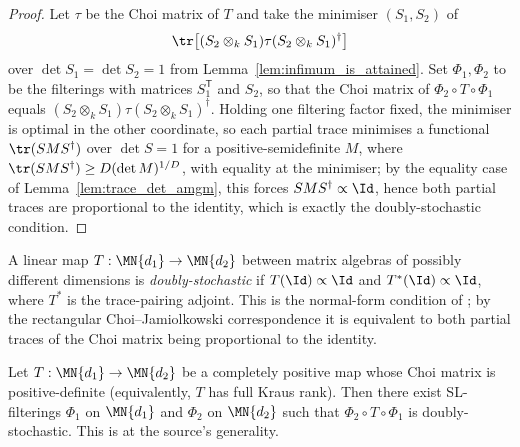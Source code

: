 \begin{proof}\leanok
    Let $\tau$ be the Choi matrix of $T$ and take the minimiser
    $(S_{1},S_{2})$ of
    \begin{align}
        \tr\!\left[(S_{2}\otimes_{k}S_{1})\tau
            (S_{2}\otimes_{k}S_{1})^{\dagger}\right]
        \notag
    \end{align}
    over $\det S_{1}=\det S_{2}=1$ from
    Lemma~\ref{lem:infimum_is_attained}. Set $\Phi_{1},\Phi_{2}$ to be the
    filterings with matrices $S_{1}^{\mathsf T}$ and $S_{2}$, so that the Choi
    matrix of $\Phi_{2}\circ T\circ\Phi_{1}$ equals
    $(S_{2}\otimes_{k}S_{1})\tau
    (S_{2}\otimes_{k}S_{1})^{\dagger}$. Holding one filtering factor fixed,
    the minimiser is optimal in the other coordinate, so each partial trace
    minimises a functional $\tr(SMS^{\dagger})$ over $\det S=1$ for a
    positive-semidefinite $M$, where
    $\tr(SMS^{\dagger})\geq D(\det M)^{1/D}$, with equality at the minimiser;
    by the equality case of Lemma~\ref{lem:trace_det_amgm}, this forces
    $SMS^{\dagger}\propto\Id$, hence both partial traces are proportional to
    the identity, which is exactly the doubly-stochastic condition.
\end{proof}

\begin{definition}
    \label{def:doubly_stochastic_rect}
    \leanok
    A linear map $T : \MN{d_1} \to \MN{d_2}$ between matrix algebras of
    possibly different dimensions is \emph{doubly-stochastic} if
    $T(\Id)\propto\Id$ and $T^{*}(\Id)\propto\Id$, where $T^{*}$ is the
    trace-pairing adjoint.  This is the normal-form condition of
    \cite[Proposition~2.9]{Wolf2012Quantum}; by the rectangular
    Choi--Jamiolkowski correspondence it is equivalent to both partial traces
    of the Choi matrix being proportional to the identity.
\end{definition}

\begin{theorem}
    \label{thm:exists_normal_form_generic_rect}
    \leanok
    Let $T : \MN{d_1} \to \MN{d_2}$ be a completely positive map whose
    Choi matrix is positive-definite (equivalently, $T$ has full Kraus
    rank). Then there exist SL-filterings $\Phi_{1}$ on $\MN{d_1}$ and
    $\Phi_{2}$ on $\MN{d_2}$ such that $\Phi_{2}\circ T\circ\Phi_{1}$
    is doubly-stochastic.  This is
    \cite[Proposition~2.9]{Wolf2012Quantum} at the source's generality.
\end{theorem}


